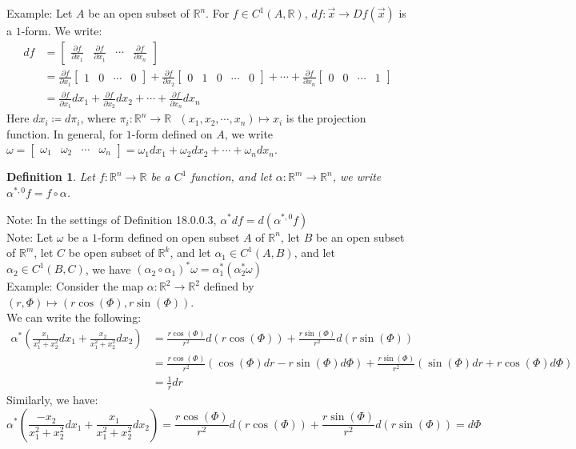 \documentclass[11pt,oneside]{book}
\theoremstyle{break}
\theoremstyle{break}
\newtheorem{defn}{Definition}[corL]
\newcommand{\R}{\mathbb{R}}
\newcommand{\bmat}[1]{\begin{bmatrix} #1 \end{bmatrix}}
\newcommand{\note}{\color{red}Note: \color{black}}
\newcommand{\example}{\color{green}Example: \color{black}}
\begin{document}
\example Let $A$ be an open subset of $\R^n$. For $f\in C^1(A,\R)$, $df:\vec{x} \to Df(\vec{x})$ is a $1$-form. We write:
\begin{align*}
df &= \bmat{\frac{\partial f}{\partial x_1}&\frac{\partial f}{\partial x_1} &\cdots& \frac{\partial f}{\partial x_n}}\\ &= \frac{\partial f}{\partial x_1}\bmat{1&0&\cdots&0} + \frac{\partial f}{\partial x_2}\bmat{0&1&0&\cdots&0} + \cdots + \frac{\partial f}{\partial x_n}\bmat{0&0&\cdots&1} \\&= \frac{\partial f}{\partial x_1} dx_1 + \frac{\partial f}{\partial x_2 }dx_2 + \cdots + \frac{\partial f}{\partial x_n}dx_n
\end{align*}
Here $dx_i \coloneqq d\pi_i$, where $\pi_i : \R^n \to \R \ \ \ (x_1,x_2,\cdots, x_n)\mapsto x_i$ is the projection function.
In general, for $1$-form defined on $A$, we write $\omega = \bmat{\omega_1 &\omega_2 &\cdots &\omega_n} = \omega_1 dx_1 +\omega_2 dx_2 + \cdots + \omega_n dx_n$.\\

\begin{defn}
Let $f:\R^n \to \R$ be a $C^1$ function, and let $\alpha:\R^m \to \R^n$, we write $\alpha^{*,0}f = f\circ \alpha$.
\end{defn}


\note In the settings of Definition 18.0.0.3, $\alpha^*df = d(\alpha^{*,0}f)$\\
\note Let $\omega$ be a $1$-form defined on open subset $A$ of $\R^n$, let $B$ be an open subset of $\R^m$, let $C$ be open subset of $\R^k$, and let $\alpha_1 \in C^1(A,B)$, and let $\alpha_2 \in C^1(B,C)$, we have $(\alpha_2 \circ \alpha_1)^*\omega = \alpha_1^*(\alpha_2^*\omega)$\\
\newpage
\example Consider the map $\alpha:\R^2 \to \R^2$ defined by $(r,\Phi) \mapsto (r\cos(\Phi), r\sin(\Phi))$. \\We can write the following:
\begin{align*}
\alpha^* \left(\frac{x_1}{x_1^2+x_2^2}dx_1 + \frac{x_2}{x_1^2+x_2^2}dx_2  \right)&=\frac{r\cos(\Phi)}{r^2}d(r\cos(\Phi)) + \frac{r\sin(\Phi)}{r^2}d(r\sin(\Phi))\\
&=\frac{r\cos(\Phi)}{r^2}(\cos(\Phi)dr - r\sin(\Phi) d\Phi)+ \frac{r\sin(\Phi)}{r^2}(\sin(\Phi) dr + r\cos(\Phi)d\Phi)\\
&= \frac{1}{r}dr
\end{align*}
Similarly, we have:
$$\alpha^*  \left(\frac{-x_2}{x_1^2+x_2^2}dx_1 + \frac{x_1}{x_1^2+x_2^2}dx_2  \right)=\frac{r\cos(\Phi)}{r^2}d(r\cos(\Phi)) + \frac{r\sin(\Phi)}{r^2}d(r\sin(\Phi)) = d\Phi$$
\end{document}
